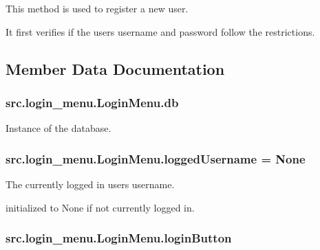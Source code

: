 This method is used to register a new user. 

It first verifies if the user\textquotesingle{}s username and password follow the restrictions. 

\subsection{Member Data Documentation}
\hypertarget{classsrc_1_1login__menu_1_1_login_menu_a9a3d5cb39385fb4b3d10f46af5543205}{}
\subsubsection[{db}]{\setlength{\rightskip}{0pt plus 5cm}src.\+login\+\_\+menu.\+Login\+Menu.\+db}\label{classsrc_1_1login__menu_1_1_login_menu_a9a3d5cb39385fb4b3d10f46af5543205}


Instance of the database. 

\hypertarget{classsrc_1_1login__menu_1_1_login_menu_a3c59b83a7a55f2334a015dfc722e86da}{}
\subsubsection[{logged\+Username}]{\setlength{\rightskip}{0pt plus 5cm}src.\+login\+\_\+menu.\+Login\+Menu.\+logged\+Username = None\hspace{0.3cm}{\ttfamily [static]}}\label{classsrc_1_1login__menu_1_1_login_menu_a3c59b83a7a55f2334a015dfc722e86da}


The currently logged in user\textquotesingle{}s username. 

initialized to \textquotesingle{}None\textquotesingle{} if not currently logged in. \hypertarget{classsrc_1_1login__menu_1_1_login_menu_a6e91fe2dc9a5b4bb26019242e84ce986}{}
\subsubsection[{login\+Button}]{\setlength{\rightskip}{0pt plus 5cm}src.\+login\+\_\+menu.\+Login\+Menu.\+login\+Button}\label{classsrc_1_1login__menu_1_1_login_menu_a6e91fe2dc9a5b4bb26019242e84ce986}


